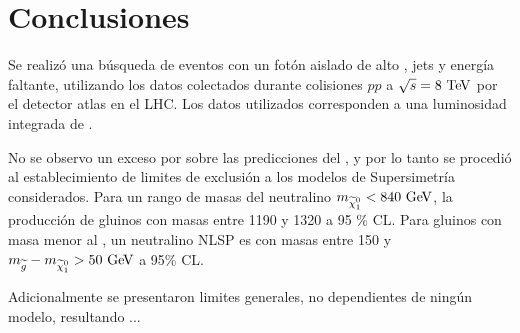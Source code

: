 \chapter{Conclusiones}

Se realizó una búsqueda de eventos con un fotón aislado de alto {\pt}, jets y
energía faltante, utilizando los datos colectados durante colisiones $pp$ a
$\sqrt{s}=8 \tev$ por el detector atlas en el LHC. Los datos utilizados
corresponden a una luminosidad integrada de {\ilumi}.

No se observo un exceso por sobre las predicciones del {\SM}, y por lo tanto se
procedió al establecimiento de limites de exclusión a los modelos de
Supersimetría considerados. Para un rango de masas del neutralino $m_{\ninoone}
< 840 \gev$, la producción de gluinos con masas entre 1190 y 1320 \gev a 95 \%
CL. Para gluinos con masa menor al \tev, un neutralino NLSP es con masas entre
150 {\gev} y $m_{\gluino}-m_{\ninoone} > 50 \gev$ a 95\% CL.

Adicionalmente se presentaron limites generales, no dependientes de ningún
modelo, resultando ...
